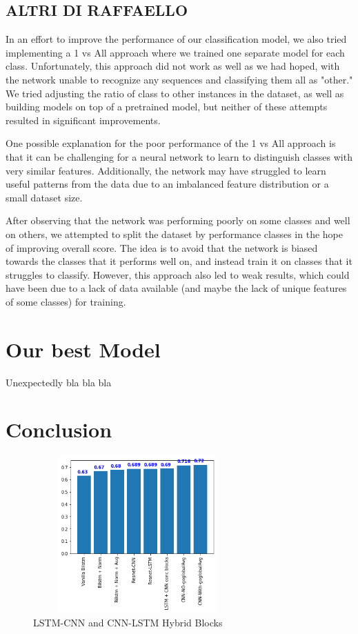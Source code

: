 \documentclass[11pt]{article}
\begin{document}
\subsection{ALTRI DI RAFFAELLO}
In an effort to improve the performance of our classification model, we also tried implementing a 1 vs All approach where we trained one separate model for each class.
Unfortunately, this approach did not work as well as we had hoped, with the network unable to recognize any sequences and classifying them all as "other."
We tried adjusting the ratio of class to other instances in the dataset, as well as building models on top of a pretrained model, but neither of these attempts resulted in significant improvements.

One possible explanation for the poor performance of the 1 vs All approach is that it can be challenging for a neural network to learn to distinguish
classes with very similar features.
Additionally, the network may have struggled to learn useful patterns from the data due to an imbalanced feature distribution or a small dataset size.

After observing that the network was performing poorly on some classes and well on others, we attempted to split the dataset by performance classes in the hope of improving overall score.
The idea is to avoid that the network is biased towards the classes that it performs well on, and instead train it on classes that it struggles to classify.
However, this approach also led to weak results, which could have been due to a lack of data available (and maybe the lack of unique features of some classes) for training.

\section{Our best Model}
Unexpectedly bla bla bla





\section{Conclusion}

\begin{figure}[h]
  \centering
  \includegraphics[width=8cm, height=6cm]{chart}
  \caption{LSTM-CNN and CNN-LSTM Hybrid Blocks}
\end{figure}


\end{document}
